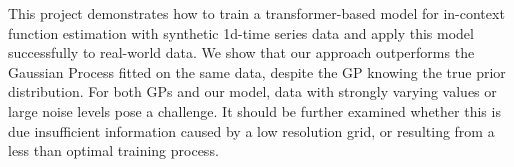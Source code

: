 This project demonstrates how to train a transformer-based model for in-context function estimation with synthetic 1d-time series data and apply this model successfully to real-world data. We show that our approach outperforms the Gaussian Process fitted on the same data, despite the GP knowing the true prior distribution. For both GPs and our model, data with strongly varying values or large noise levels pose a challenge. It should be further examined whether this is due insufficient information caused by a low resolution grid, or resulting from a less than optimal training process.